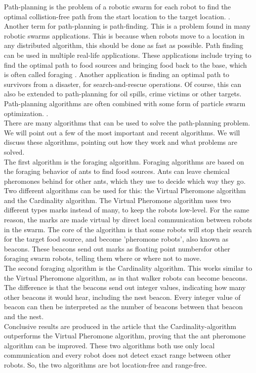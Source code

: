 
Path-planning is the problem of a robotic swarm for each robot to find the optimal collistion-free path from the start location to the target location. \cite{qin2004path}.
Another term for path-planning is path-finding. 
This is a problem found in many robotic swarms applications.
This is because when robots move to a location in any distributed algorithm, this should be done as fast as possible. 
Path finding can be used in multiple real-life applications.
These applications include trying to find the optimal path to food sources and bringing food back to the base, which is often called foraging \cite{hoff2010two}.
Another application is finding an optimal path to survivors from a disaster, for search-and-rescue operations.
Of course, this can also be extended to path-planning for oil spills, crime victims or other targets.\cite{pugh2007inspiring} 
Path-planning algorithms are often combined with some form of particle swarm optimization. \cite{poli2007particle}. \\

There are many algorithms that can be used to solve the path-planning problem. 
We will point out a few of the most important and recent algorithms. \cite{hoff2010two} \cite{Bhattacharjee} \cite{Jung} \cite{Kala}
We will discuss these algorithms, pointing out how they work and what problems are solved. \\

The first algorithm is the foraging algorithm. \cite{hoff2010two}
Foraging algorithms are based on the foraging behavior of ants to find food sources. 
Ants can leave chemical pheromones behind for other ants, which they use to decide which way they go. 
Two different algorithms can be used for this: the Virtual Pheromone algorithm and the Cardinality algorithm.
The Virtual Pheromone algorithm uses two different types marks instead of many, to keep the robots low-level. 
For the same reason, the marks are made virtual by direct local communication between robots in the swarm.
The core of the algorithm is that some robots will stop their search for the target food source, and become 'pheromone robots', also known as beacons.
These beacons send out marks as floating point numbersfor other foraging swarm robots, telling them where or where not to move. \\
The second foraging algorithm is the Cardinality algorithm. 
This works similar to the Virtual Pheromone algorithm, as in that walker robots can become beacons. 
The difference is that the beacons send out integer values, indicating how many other beacons it would hear, including the nest beacon. 
Every integer value of beacon can then be interpreted as the number of beacons between that beacon and the nest. \\
Conclusive results are produced in the article that the Cardinality-algorithm outperforms the Virtual Pheromone algorithm, proving that the ant pheromone algorithm can be improved.
These two algorithms both use only local communication and every robot does not detect exact range between other robots.
So, the two algorithms are bot location-free and range-free. \\

